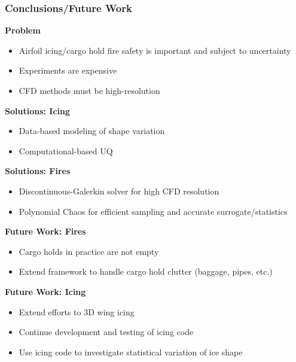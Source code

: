 \documentclass[9pt]{beamer}
\begin{document}
\begin{frame}
\frametitle{Conclusions/Future Work}
\label{sec-5-7}


\textbf{Problem}
\begin{itemize}
\item Airfoil icing/cargo hold fire safety is important and subject to uncertainty
\item Experiments are expensive
\item CFD methods must be high-resolution
\end{itemize}
\textbf{Solutions: Icing}
\begin{itemize}
\item Data-based modeling of shape variation
\item Computational-based UQ
\end{itemize}
\textbf{Solutions: Fires}
\begin{itemize}
\item Discontinuous-Galerkin solver for high CFD resolution
\item Polynomial Chaos for efficient sampling and accurate surrogate/statistics
\end{itemize}
\textbf{Future Work: Fires}
\begin{itemize}
\item Cargo holds in practice are not empty
\item Extend framework to handle cargo hold clutter (baggage, pipes, etc.)
\end{itemize}
\textbf{Future Work: Icing}
\begin{itemize}
\item Extend efforts to 3D wing icing
\item Continue development and testing of icing code
\item Use icing code to investigate statistical variation of ice shape
\end{itemize}
\end{frame}
\end{document}
